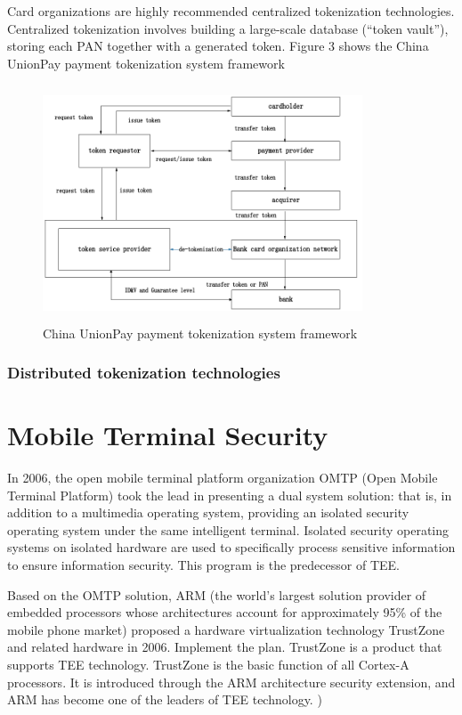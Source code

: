 \documentclass[journal]{IEEEtran}
\begin{document}
Card organizations are highly recommended centralized tokenization technologies. 
Centralized tokenization involves building a large-scale database (“token vault”), storing each PAN together with a generated token. Figure 3 shows the China UnionPay payment tokenization system framework

\begin{figure}[htbp]
\centerline{\includegraphics[width=9.5cm,height=7cm]{zhifubiaojikuangjia.png}}
\caption{China UnionPay payment tokenization system framework}
\label{fig}
\end{figure}

\subsubsection{Distributed tokenization technologies}

\section{Mobile Terminal Security}
In 2006, the open mobile terminal platform organization OMTP (Open Mobile Terminal Platform) took the lead in presenting a dual system solution: that is, in addition to a multimedia operating system, providing an isolated security operating system under the same intelligent terminal. Isolated security operating systems on isolated hardware are used to specifically process sensitive information to ensure information security. This program is the predecessor of TEE.

Based on the OMTP solution, ARM (the world's largest solution provider of embedded processors whose architectures account for approximately 95\% of the mobile phone market) proposed a hardware virtualization technology TrustZone and related hardware in 2006. Implement the plan. TrustZone is a product that supports TEE technology. TrustZone is the basic function of all Cortex-A processors. It is introduced through the ARM architecture security extension, and ARM has become one of the leaders of TEE technology. )
\end{document}
